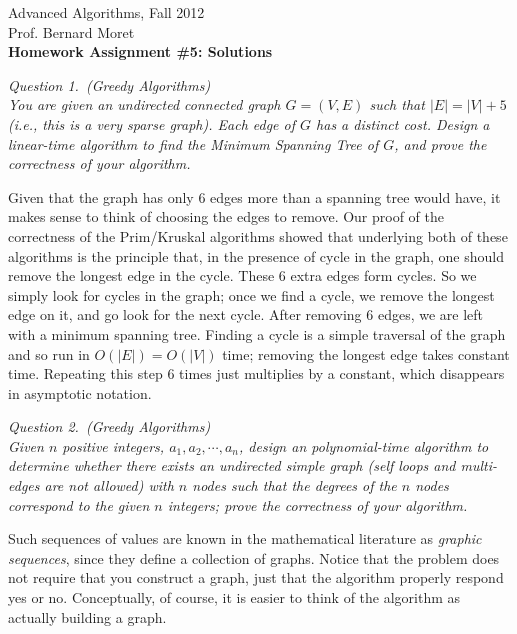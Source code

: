 \documentclass[11pt]{article}
\begin{document}
  \thispagestyle{empty}

\begin{center}
  \Large\sf Advanced Algorithms, Fall 2012\\
  
  \medskip
  \large\sf Prof. Bernard Moret\\

  \medskip\bigskip
  \Large\bf Homework Assignment \#5: Solutions
\end{center}

\bigskip\rm\noindent
\emph{Question 1.~(Greedy Algorithms)}\\
{\footnotesize\it You are given an undirected connected graph $G=(V, E)$ such that $|E| = |V| +
5$ (i.e., this is a very sparse graph).  Each edge of $G$ has a distinct cost.
Design a linear-time algorithm to find the Minimum Spanning Tree of $G$, and
prove the correctness of your algorithm.}

Given that the graph has only 6 edges more than a spanning tree would have,
it makes sense to think of choosing the edges to remove.  Our proof of the
correctness of the Prim/Kruskal algorithms showed that underlying both
of these algorithms is the principle that, in the presence of cycle in the
graph, one should remove the longest edge in the cycle.  These 6 extra edges
form cycles.  So we simply look for cycles in the graph; once we find a cycle,
we remove the longest edge on it, and go look for the next cycle.
After removing 6 edges, we are left with a minimum spanning tree.
Finding a cycle is a simple traversal of the graph and so run in $O(|E|)=O(|V|)$
time; removing the longest edge takes constant time.  Repeating this step
6 times just multiplies by a constant, which disappears in asymptotic notation.

\bigskip\rm\noindent
\emph{Question 2.~(Greedy Algorithms)}\\
{\footnotesize\it Given $n$ positive integers, $a_1, a_2,\cdots, a_n$, design an polynomial-time
algorithm to determine whether there exists an undirected simple graph
(self loops and multi-edges are not allowed) with $n$ nodes such that
the degrees of the $n$ nodes correspond to the given $n$ integers; prove the
correctness of your algorithm.}

Such sequences of values are known in the mathematical literature as
\emph{graphic sequences}, since they define a collection of graphs.
Notice that the problem does not require that you construct a graph,
just that the algorithm properly respond yes or no.  Conceptually, of
course, it is easier to think of the algorithm as actually building
a graph.
\end{document}

